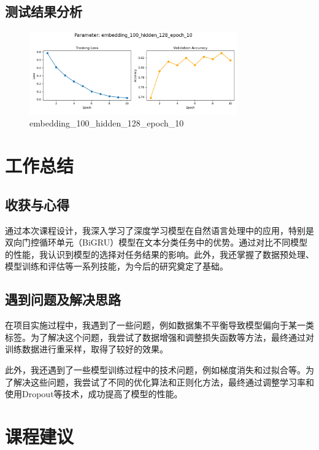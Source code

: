 \section{测试结果分析}


\begin{figure}[ht]
  \centering
  \includegraphics[width=0.8\textwidth]{../Output/Graph/embedding_100_hidden_128_epoch_10.png}
  \caption{embedding\_100\_hidden\_128\_epoch\_10}
\end{figure}




\chapter{工作总结}

\section{收获与心得}

通过本次课程设计，我深入学习了深度学习模型在自然语言处理中的应用，特别是双向门控循环单元（BiGRU）模型在文本分类任务中的优势。通过对比不同模型的性能，我认识到模型的选择对任务结果的影响。此外，我还掌握了数据预处理、模型训练和评估等一系列技能，为今后的研究奠定了基础。

\section{遇到问题及解决思路}

在项目实施过程中，我遇到了一些问题，例如数据集不平衡导致模型偏向于某一类标签。为了解决这个问题，我尝试了数据增强和调整损失函数等方法，最终通过对训练数据进行重采样，取得了较好的效果。

此外，我还遇到了一些模型训练过程中的技术问题，例如梯度消失和过拟合等。为了解决这些问题，我尝试了不同的优化算法和正则化方法，最终通过调整学习率和使用Dropout等技术，成功提高了模型的性能。

\chapter{课程建议}

